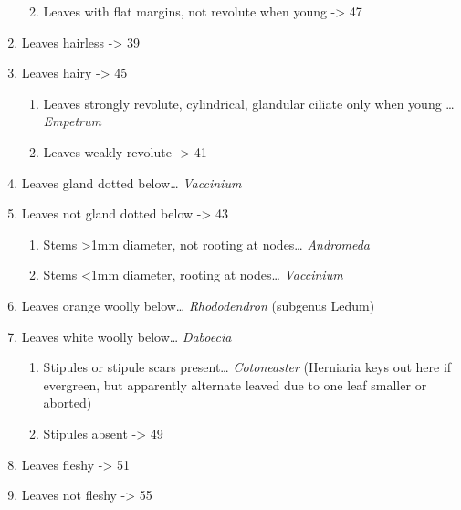 \documentclass[openany]{book}
\providecommand{\tightlist}{%
  \setlength{\itemsep}{0pt}\setlength{\parskip}{0pt}}
\begin{document}
\begin{enumerate}
  \begin{enumerate}
  \def\labelenumii{\arabic{enumii}.}
  \setcounter{enumii}{35}
  \tightlist
  \item
    Leaves with flat margins, not revolute when young -\textgreater{} 47
  \end{enumerate}
\item
  Leaves hairless -\textgreater{} 39
\item
  Leaves hairy -\textgreater{} 45

  \begin{enumerate}
  \def\labelenumii{\arabic{enumii}.}
  \setcounter{enumii}{38}
  \tightlist
  \item
    Leaves strongly revolute, cylindrical, glandular ciliate only when
    young \ldots{} \emph{Empetrum}
  \item
    Leaves weakly revolute -\textgreater{} 41
  \end{enumerate}
\item
  Leaves gland dotted below\ldots{} \emph{Vaccinium}
\item
  Leaves not gland dotted below -\textgreater{} 43

  \begin{enumerate}
  \def\labelenumii{\arabic{enumii}.}
  \setcounter{enumii}{42}
  \tightlist
  \item
    Stems \textgreater{}1mm diameter, not rooting at nodes\ldots{}
    \emph{Andromeda}
  \item
    Stems \textless{}1mm diameter, rooting at nodes\ldots{}
    \emph{Vaccinium}
  \end{enumerate}
\item
  Leaves orange woolly below\ldots{} \emph{Rhododendron} (subgenus
  Ledum)
\item
  Leaves white woolly below\ldots{} \emph{Daboecia}

  \begin{enumerate}
  \def\labelenumii{\arabic{enumii}.}
  \setcounter{enumii}{46}
  \tightlist
  \item
    Stipules or stipule scars present\ldots{} \emph{Cotoneaster}
    (Herniaria keys out here if evergreen, but apparently alternate
    leaved due to one leaf smaller or aborted)
  \item
    Stipules absent -\textgreater{} 49
  \end{enumerate}
\item
  Leaves fleshy -\textgreater{} 51
\item
  Leaves not fleshy -\textgreater{} 55


\end{enumerate}
\end{document}
